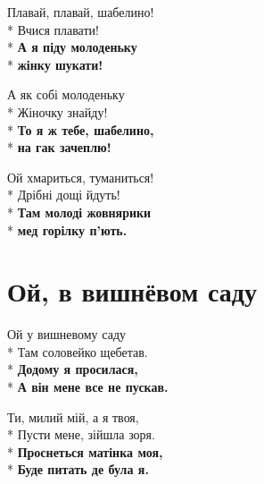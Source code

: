 \begin{minipage}{\linewidth}
Плавай, плавай, шабелино!\\*
Вчися плавати!\\*
\textbf{А я піду молоденьку}\\*
\textbf{жінку шукати!}\\
\end{minipage}\par\medskip\nobreak

\medskip

\begin{minipage}{\linewidth}
А як собі молоденьку\\*
Жіночку знайду!\\*
\textbf{То я ж тебе, шабелино,}\\*
\textbf{на гак зачеплю!}\\
\end{minipage}\par\medskip\nobreak

\medskip

\begin{minipage}{\linewidth}
Ой хмариться, туманиться!\\*
Дрібні дощі йдуть!\\*
\textbf{Там молоді жовнярики}\\*
\textbf{мед горілку п’ють.}\\
\end{minipage}

\vspace{\fill}\newpage

\section{Ой, в вишнёвом саду}
\label{song:Ой,_в_вишнёвом_саду}

\medskip

\begin{minipage}{\linewidth}
Ой у вишневому саду\\*
Там соловейко щебетав.\\*
\textbf{Додому я просилася,}\\*
\textbf{А він мене все не пускав.}\\
\end{minipage}\par\medskip\nobreak

\medskip

\begin{minipage}{\linewidth}
Ти, милий мій, а я твоя,\\*
Пусти мене, зійшла зоря.\\*
\textbf{Проснеться матінка моя,}\\*
\textbf{Буде питать де була я.}\\
\end{minipage}\par\medskip\nobreak

